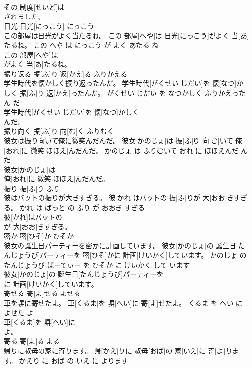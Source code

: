 \documentclass[8pt]{extreport}
\begin{document}
\begin{CJK}{UTF8}{min}
\\	その 制度[せいど]は
\\	されました。			
\\	日光	日光[にっこう]	にっこう	
\\	この部屋は日光がよく当たるね。	この 部屋[へや]は 日光[にっこう]がよく 当[あ]たるね。	この へや は にっこう が よく あたる ね	
\\	この 部屋[へや]は
\\	がよく 当[あ]たるね。			
\\	振り返る	振[ふ]り 返[かえ]る	ふりかえる	
\\	学生時代を懐かしく振り返ったんだ。	学生時代[がくせい じだい]を 懐[なつ]かしく 振[ふ]り 返[かえ]ったんだ。	がくせい じだい を なつかしく ふりかえった ん だ	
\\	学生時代[がくせい じだい]を 懐[なつ]かしく
\\	んだ。			
\\	振り向く	振[ふ]り 向[む]く	ふりむく	
\\	彼女は振り向いて俺に微笑んだんだ。	彼女[かのじょ]は 振[ふ]り 向[む]いて 俺[おれ]に 微笑[ほほえ]んだんだ。	かのじょ は ふりむいて おれ に ほほえんだ ん だ	
\\	彼女[かのじょ]は
\\	俺[おれ]に 微笑[ほほえ]んだんだ。			
\\	振り	振[ふ]り	ふり	
\\	彼はバットの振りが大きすぎる。	彼[かれ]はバットの 振[ふ]りが 大[おお]きすぎる。	かれ は ばっと の ふり が おおき すぎる	
\\	彼[かれ]はバットの
\\	が 大[おお]きすぎる。			
\\	密か	密[ひそ]か	ひそか	
\\	彼女の誕生日パーティーを密かに計画しています。	彼女[かのじょ]の 誕生日[たんじょうび]パーティーを 密[ひそ]かに 計画[けいかく]しています。	かのじょ の たんじょうび ぱーてぃー を ひそか に けいかく して います	
\\	彼女[かのじょ]の 誕生日[たんじょうび]パーティーを
\\	に 計画[けいかく]しています。			
\\	寄せる	寄[よ]せる	よせる	
\\	車を塀に寄せたよ。	車[くるま]を 塀[へい]に 寄[よ]せたよ。	くるま を へい に よせた よ	
\\	車[くるま]を 塀[へい]に
\\	よ。			
\\	寄る	寄[よ]る	よる	
\\	帰りに叔母の家に寄ります。	帰[かえ]りに 叔母[おば]の 家[いえ]に 寄[よ]ります。	かえり に おば の いえ に よります	

\end{CJK}
\end{document}
